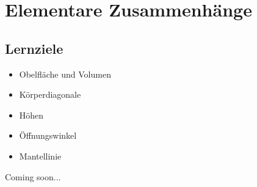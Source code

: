 \section{Elementare Zusammenhänge}
\sectuntertitel{}


\subsection*{Lernziele}
\begin{itemize}
\item Obelfläche und Volumen
\item Körperdiagonale
\item Höhen
\item Öffnungswinkel
\item Mantellinie
\end{itemize}

Coming soon...
